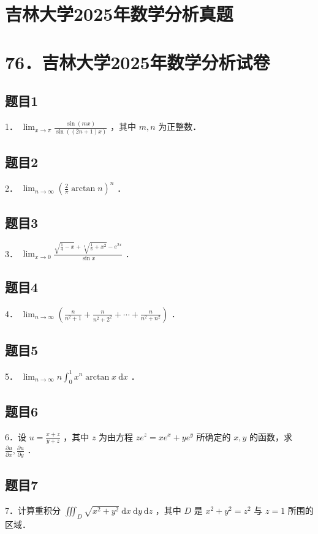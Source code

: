 \documentclass{article}
\begin{document}
\section*{吉林大学2025年数学分析真题}
\section*{76．吉林大学2025年数学分析试卷}

\subsection{题目1}
1． \(\lim _{x \rightarrow \pi} \frac{\sin (m x)}{\sin ((2 n+1) x)}\) ，其中 \(m, n\) 为正整数．

\subsection{题目2}
2． \(\lim _{n \rightarrow \infty}\left(\frac{2}{\pi} \arctan n\right)^{n}\) ．

\subsection{题目3}
3． \(\lim _{x \rightarrow 0} \frac{\sqrt{\frac{1}{4}-x}+\sqrt[3]{\frac{1}{8}+x^{2}}-e^{2 x}}{\sin x}\) ．

\subsection{题目4}
4． \(\lim _{n \rightarrow \infty}\left(\frac{n}{n^{2}+1}+\frac{n}{n^{2}+2^{2}}+\cdots+\frac{n}{n^{2}+n^{2}}\right)\) ．

\subsection{题目5}
5． \(\lim _{n \rightarrow \infty} n \int_{0}^{1} x^{n} \arctan x \mathrm{~d} x\) ．

\subsection{题目6}
6．设 \(u=\frac{x+z}{y+z}\) ，其中 \(z\) 为由方程 \(z e^{z}=x e^{x}+y e^{y}\) 所确定的 \(x, y\) 的函数，求 \(\frac{\partial u}{\partial x}, \frac{\partial u}{\partial y}\) ．

\subsection{题目7}
7．计算重积分 \(\iiint_{D} \sqrt{x^{2}+y^{2}} \mathrm{~d} x \mathrm{~d} y \mathrm{~d} z\) ，其中 \(D\) 是 \(x^{2}+y^{2}=z^{2}\) 与 \(z=1\) 所围的区域．
\end{document}
